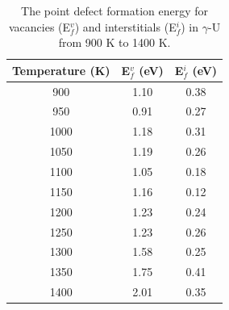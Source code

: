 \documentclass[review]{elsarticle}
\begin{document}
\begin{appendices}
\begin{table}[h]
\caption{The point defect formation energy for vacancies (E$_{f}^{v}$) and interstitials (E$_{f}^{i}$) in $\gamma$-U from 900 K to 1400 K.} \label{tab:defs}
\begin{center}
\begin{tabular}{|c|c|c|}
	\hline
	Temperature (K) & E$_{f}^{v}$ (eV) & E$_{f}^{i}$ (eV) \\
	 \hline
  	   900 & 1.10 & 0.38 \\
	   950 & 0.91 & 0.27 \\
	 1000 & 1.18 & 0.31 \\
	 1050 & 1.19 & 0.26 \\
	 1100 & 1.05 & 0.18 \\
	 1150 & 1.16 & 0.12 \\
	 1200 & 1.23 & 0.24 \\
	 1250 & 1.23 & 0.26 \\
	 1300 & 1.58 & 0.25 \\
	 1350 & 1.75 & 0.41 \\
	 1400 & 2.01 & 0.35 \\
	 \hline
\end{tabular}
\end{center}
\label{default}
\end{table}

\FloatBarrier

\end{appendices}


\end{document}

